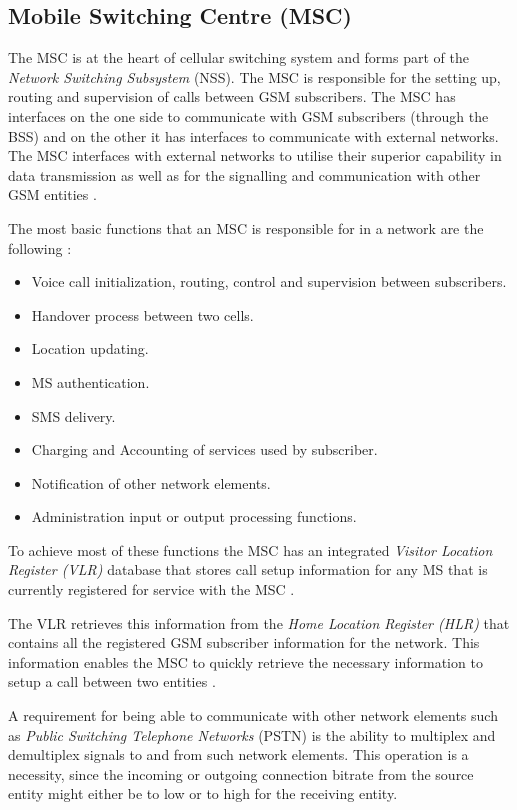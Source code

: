 \subsection{Mobile Switching Centre (MSC)}

The MSC is at the heart of cellular switching system and forms part of the \emph{Network Switching Subsystem} (NSS). The MSC is responsible for the setting up, routing and supervision of calls between GSM subscribers\cite{GSM92,GSMSysEngin}. The MSC has interfaces on the one side to communicate with GSM subscribers (through the BSS) and on the other it has interfaces to communicate with external networks\cite{GSM92}. The MSC interfaces with external networks to utilise their superior capability in data transmission as well as for the signalling and communication with other GSM entities \cite{GSM92}. 

The most basic functions that an MSC is responsible for in a network are the following \cite{wirelesstelcoMullet}:
\begin{itemize}
\item Voice call initialization, routing, control and supervision between subscribers.
\item Handover process between two cells.
\item Location updating.
\item MS authentication.
\item SMS delivery.
\item Charging and Accounting of services used by subscriber.
\item Notification of other network elements.
\item Administration input or output processing functions.
\end{itemize}

To achieve most of these functions the MSC has an integrated \emph{Visitor Location Register (VLR)} database that stores call setup information for any MS that is currently registered for service with the MSC \cite{GSM92,wirelesstelcoMullet}. 

The VLR retrieves this information from the \emph{Home Location Register (HLR)} that contains all the registered GSM subscriber information for the network. This information enables the MSC to quickly retrieve the necessary information to setup a call between two entities \cite{GSMSysEngin,GSMSecurInTeleNetwork}.

A requirement for being able to communicate with other network elements such as \emph{Public Switching Telephone Networks} (PSTN) is the ability to multiplex and demultiplex signals to and from such network elements. This operation is a necessity, since the incoming or outgoing connection bitrate from the source entity might either be to low or to high for the receiving entity.

